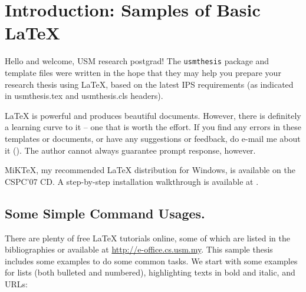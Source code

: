 \chapter{Introduction: Samples of Basic \LaTeX{}}\label{chap:intro}

Hello and welcome, \ac{USM} research postgrad!  The \verb|usmthesis| package and template files were written in the hope that they may help you prepare your research thesis using \LaTeX, based on the latest \ac{IPS} requirements (as indicated in usmthesis.tex and usmthesis.cls headers).

\LaTeX{} is powerful and produces beautiful documents.  However, there is definitely a learning curve to it -- one that is worth the effort.  %
If you find any errors in these templates or documents, or have any suggestions or feedback, do e-mail me about it ().
The author cannot always guarantee prompt response, however. \Smiley

MiK\TeX{}, my recommended \LaTeX{} distribution for Windows, is available on the CSPC'07 CD. A step-by-step installation walkthrough is available at \citep{lim:latextypesetting}.

\section{Some Simple Command Usages.}

There are plenty of free \LaTeX{} tutorials online, some of which are listed in the bibliographies or available at \url{http://e-office.cs.usm.my}.  This sample thesis includes some examples to do some common tasks.  We start with some examples for lists (both bulleted and numbered), highlighting texts in bold and italic, and URLs:


